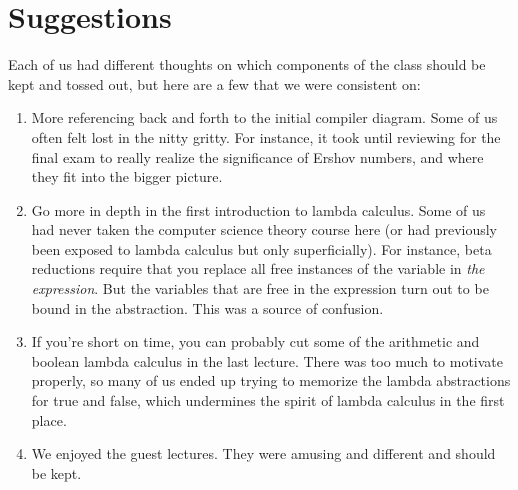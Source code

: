 \section{Suggestions}
Each of us had different thoughts on which components of the class should be kept and tossed out, but here are a few that we were consistent on:

\begin{enumerate}
\item More referencing back and forth to the initial compiler diagram. Some of us often felt lost in the nitty gritty. For instance, it took until reviewing for the final exam to really realize the significance of Ershov numbers, and where they fit into the bigger picture.
\item Go more in depth in the first introduction to lambda calculus. Some of us had never taken the computer science theory course here (or had previously been exposed to lambda calculus but only superficially). For instance, beta reductions require that you replace all free instances of the variable in \emph{the expression}. But the variables that are free in the expression turn out to be bound in the abstraction. This was a source of confusion. 
\item If you're short on time, you can probably cut some of the arithmetic and boolean lambda calculus in the last lecture. There was too much to motivate properly, so many of us ended up trying to memorize the lambda abstractions for true and false, which undermines the spirit of lambda calculus in the first place.
\item We enjoyed the guest lectures. They were amusing and different and should be kept.
\end{enumerate} 
